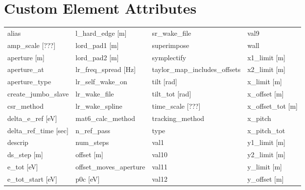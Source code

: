  \section{Custom Element Attributes}
 \label{s:list.custom}
 
 \begin{tabular}{llll} \toprule
alias                          & l_hard_edge [m]                & sr_wake_file                   & val9                           \\
amp_scale [???]                & lord_pad1 [m]                  & superimpose                    & wall                           \\
aperture [m]                   & lord_pad2 [m]                  & symplectify                    & x1_limit [m]                   \\
aperture_at                    & lr_freq_spread [Hz]            & taylor_map_includes_offsets    & x2_limit [m]                   \\
aperture_type                  & lr_self_wake_on                & tilt [rad]                     & x_limit [m]                    \\
create_jumbo_slave             & lr_wake_file                   & tilt_tot [rad]                 & x_offset [m]                   \\
csr_method                     & lr_wake_spline                 & time_scale [???]               & x_offset_tot [m]               \\
delta_e_ref [eV]               & mat6_calc_method               & tracking_method                & x_pitch                        \\
delta_ref_time [sec]           & n_ref_pass                     & type                           & x_pitch_tot                    \\
descrip                        & num_steps                      & val1                           & y1_limit [m]                   \\
ds_step [m]                    & offset [m]                     & val10                          & y2_limit [m]                   \\
e_tot [eV]                     & offset_moves_aperture          & val11                          & y_limit [m]                    \\
e_tot_start [eV]               & p0c [eV]                       & val12                          & y_offset [m]                   \\

\end{tabular}
